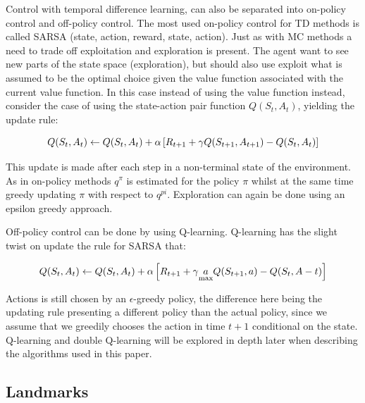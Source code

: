 Control with temporal difference learning, can also be separated into on-policy control and off-policy control. The most used on-policy control for TD methods is called SARSA (state, action, reward, state, action). Just as with MC methods a need to trade off exploitation and exploration is present. The agent want to see new parts of the state space (exploration), but should also use exploit what is assumed to be the optimal choice given the value function associated with the current value function. In this case instead of using the value function instead, consider the case of using the state-action pair function $Q(S_t, A_t)$, yielding the update rule:

\begin{equation}
    Q(S_t, A_t) \leftarrow Q(S_t, A_t) + \alpha \left[ R_{t+1} + \gamma Q(S_{t+1}, A_{t+1}) - Q(S_t, A_t) \right]
\end{equation}

This update is made after each step in a non-terminal state of the environment. As in on-policy methods $q^{\pi}$ is estimated for the policy $\pi$ whilst at the same time greedy updating $\pi$ with respect to $q^{pi}$. Exploration can again be done using an epsilon greedy approach.

Off-policy control can be done by using Q-learning. Q-learning has the slight twist on update the rule for SARSA that:

\begin{equation}
    Q(S_t, A_t) \leftarrow Q(S_t, A_t) + \alpha \left[ R_{t+1} + \gamma \underset{\max}{a} Q(S_{t + 1}, a) - Q(S_t, A-t) \right] 
\end{equation}

Actions is still chosen by an $\epsilon$-greedy policy, the difference here being the updating rule presenting a different policy than the actual policy, since we assume that we greedily chooses the action in time $t+1$ conditional on the state. Q-learning and double Q-learning will be explored in depth later when describing the algorithms used in this paper.

\subsection{Landmarks}

